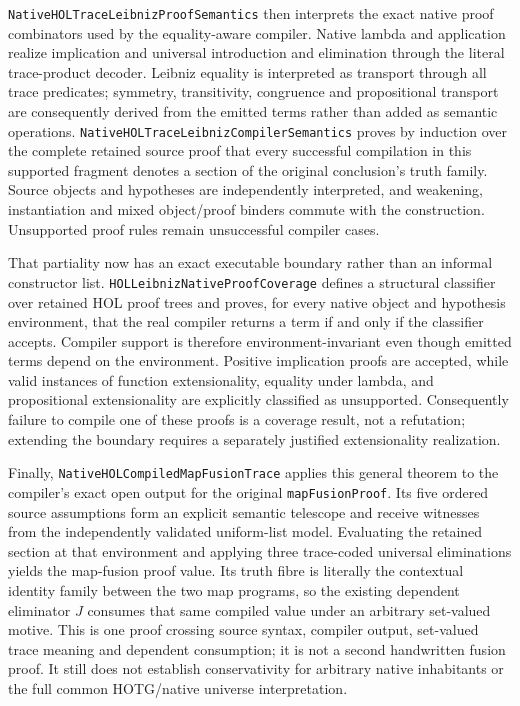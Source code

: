 \documentclass[11pt]{article}
\theoremstyle{definition}
\theoremstyle{remark}
\begin{document}
\nolinkurl{NativeHOLTraceLeibnizProofSemantics} then interprets the exact
native proof combinators used by the equality-aware compiler. Native lambda
and application realize implication and universal introduction and
elimination through the literal trace-product decoder. Leibniz equality is
interpreted as transport through all trace predicates; symmetry,
transitivity, congruence and propositional transport are consequently
derived from the emitted terms rather than added as semantic operations.
\nolinkurl{NativeHOLTraceLeibnizCompilerSemantics} proves by induction over
the complete retained source proof that every successful compilation in
this supported fragment denotes a section of the original conclusion's
truth family. Source objects and hypotheses are independently interpreted,
and weakening, instantiation and mixed object/proof binders commute with the
construction. Unsupported proof rules remain unsuccessful compiler cases.

That partiality now has an exact executable boundary rather than an informal
constructor list.  \nolinkurl{HOLLeibnizNativeProofCoverage} defines a
structural classifier over retained HOL proof trees and proves, for every
native object and hypothesis environment, that the real compiler returns a
term if and only if the classifier accepts.  Compiler support is therefore
environment-invariant even though emitted terms depend on the environment.
Positive implication proofs are accepted, while valid instances of function
extensionality, equality under lambda, and propositional extensionality are
explicitly classified as unsupported.  Consequently failure to compile one
of these proofs is a coverage result, not a refutation; extending the boundary
requires a separately justified extensionality realization.

Finally, \nolinkurl{NativeHOLCompiledMapFusionTrace} applies this general
theorem to the compiler's exact open output for the original
\nolinkurl{mapFusionProof}. Its five ordered source assumptions form an
explicit semantic telescope and receive witnesses from the independently
validated uniform-list model. Evaluating the retained section at that
environment and applying three trace-coded universal eliminations yields the
map-fusion proof value. Its truth fibre is literally the contextual identity
family between the two map programs, so the existing dependent eliminator
\(J\) consumes that same compiled value under an arbitrary set-valued motive.
This is one proof crossing source syntax, compiler output, set-valued trace
meaning and dependent consumption; it is not a second handwritten fusion
proof. It still does not establish conservativity for arbitrary native
inhabitants or the full common HOTG/native universe interpretation.
\end{document}
